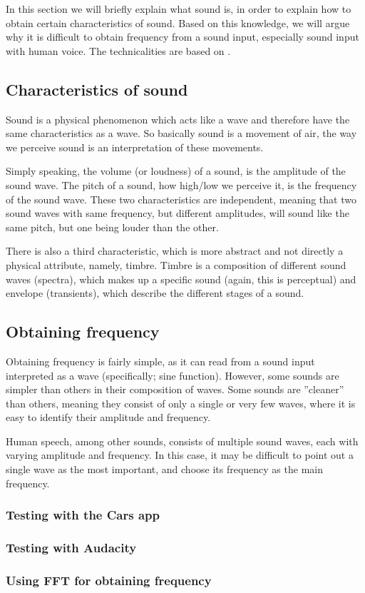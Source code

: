 In this section we will briefly explain what sound is, in order to explain how to obtain certain characteristics of sound.
Based on this knowledge, we will argue why it is difficult to obtain frequency from a sound input, especially sound input with human voice.
The technicalities are based on \cite{music-and-computers}.

\subsection{Characteristics of sound}
Sound is a physical phenomenon which acts like a wave and therefore have the same characteristics as a wave.
So basically sound is a movement of air, the way we perceive sound is an interpretation of these movements.

Simply speaking, the volume (or loudness) of a sound, is the amplitude of the sound wave.
The pitch of a sound, how high/low we perceive it, is the frequency of the sound wave.
These two characteristics are independent, meaning that two sound waves with same frequency, but different amplitudes, will sound like the same pitch, but one being louder than the other.

There is also a third characteristic, which is more abstract and not directly a physical attribute, namely, timbre.
Timbre is a composition of different sound waves (spectra), which makes up a specific sound (again, this is perceptual) and envelope (transients), which describe the different stages of a sound.

\subsection{Obtaining frequency}
Obtaining frequency is fairly simple, as it can read from a sound input interpreted as a wave (specifically; sine function).
However, some sounds are simpler than others in their composition of waves.
Some sounds are ''cleaner'' than others, meaning they consist of only a single or very few waves, where it is easy to identify their amplitude and frequency.

Human speech, among other sounds, consists of multiple sound waves, each with varying amplitude and frequency.
In this case, it may be difficult to point out a single wave as the most important, and choose its frequency as the main frequency.

\subsubsection{Testing with the Cars app}

\subsubsection{Testing with Audacity}

\subsubsection{Using FFT for obtaining frequency}
